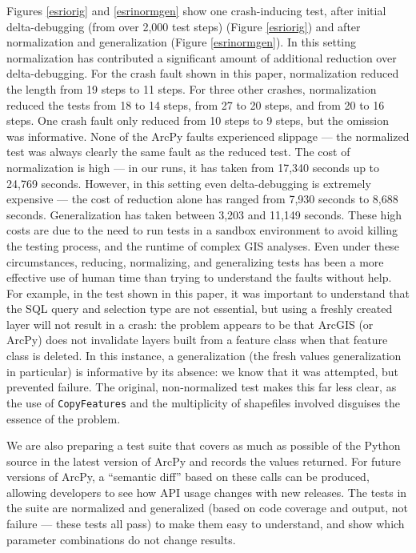 
Figures \ref{esriorig} and
\ref{esrinormgen} show one crash-inducing test, after initial
delta-debugging (from over 2,000 test steps) (Figure \ref{esriorig})
and after normalization and generalization (Figure \ref{esrinormgen}).
In this setting normalization has contributed a significant amount of
additional reduction over delta-debugging.  For the crash fault shown
in this paper, normalization reduced the length from 19 steps to 11
steps.  For three other crashes, normalization reduced the tests
from 18 to 14 steps, from 27 to 20 steps, and from 20 to 16 steps. One crash fault only reduced from 10 steps to 9 steps, but the
omission was informative.  None of the ArcPy faults experienced slippage --- the normalized
test was always clearly the same fault as the reduced test.
 The cost of normalization is high --- in
our runs, it has taken from 17,340 seconds up to 24,769 seconds.
However, in this setting even delta-debugging is extremely expensive
--- the cost of reduction alone has ranged from 7,930 seconds to 8,688
seconds.  Generalization has taken between 3,203 and
 11,149 seconds.  These high costs are due to the need to run
tests in a sandbox environment to avoid killing the testing
process, and the runtime of complex GIS analyses.
Even under these circumstances, reducing, normalizing, and
generalizing tests has been a more effective use of human time than
trying to understand the faults without help.  For example, in
the test shown in this paper, it was important to understand that
the SQL query and selection type are not essential, but using a
freshly created layer will not result in a crash: the problem appears
to be that ArcGIS (or ArcPy) does not invalidate layers built from a
feature class when that feature class is deleted.  In this
  instance, a generalization (the fresh values generalization in
  particular) is informative by its absence: we know that it was attempted, but prevented
  failure.  The original, non-normalized test
makes this far less clear, as the use of {\tt CopyFeatures} and the
multiplicity of shapefiles involved disguises the essence of the
problem.  

We are also preparing a test suite that covers as much as
possible of the Python source in the latest version of ArcPy
and records the values returned.  For future versions of ArcPy, a ``semantic diff'' based on these calls
can be produced, allowing developers to see how API usage changes with
new releases.  The tests in the suite are
normalized and generalized (based on code coverage and output, not
failure --- these tests all pass) to make them easy to understand, and show
which parameter combinations do not change results.



